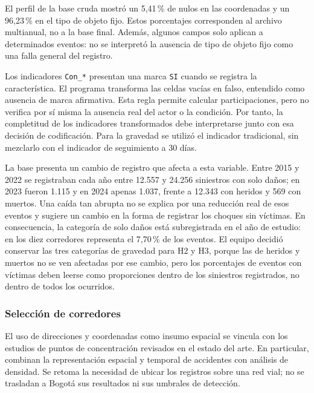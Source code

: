 \documentclass[12pt,letterpaper]{article}
\begin{document}
El perfil de la base cruda mostró un 5,41\,\% de nulos en las
coordenadas y un 96,23\,\% en el tipo de objeto fijo. Estos porcentajes
corresponden al archivo multianual, no a la base final. Además, algunos
campos solo aplican a determinados eventos: no se interpretó la ausencia
de tipo de objeto fijo como una falla general del registro.

Los indicadores \texttt{Con\_*} presentan una marca \texttt{SI} cuando
se registra la característica. El programa transforma las celdas vacías
en falso, entendido como ausencia de marca afirmativa. Esta regla permite
calcular participaciones, pero no verifica por sí misma la ausencia real
del actor o la condición. Por tanto, la completitud de los indicadores
transformados debe interpretarse junto con esa decisión de codificación.
Para la gravedad se utilizó el indicador tradicional, sin mezclarlo con
el indicador de seguimiento a 30 días.

La base presenta un cambio de registro que afecta a esta variable. Entre
2015 y 2022 se registraban cada año entre 12.557 y 24.256 siniestros con
solo daños; en 2023 fueron 1.115 y en 2024 apenas 1.037, frente a 12.343
con heridos y 569 con muertos. Una caída tan abrupta no se explica por
una reducción real de esos eventos y sugiere un cambio en la forma de
registrar los choques sin víctimas. En consecuencia, la categoría de solo daños está
subregistrada en el año de estudio: en los diez corredores representa
el 7,70\,\% de los eventos. El equipo decidió conservar las tres
categorías de gravedad para H2 y H3, porque las de heridos y muertos no
se ven afectadas por ese cambio, pero los porcentajes de eventos con
víctimas deben leerse como proporciones dentro de los siniestros
registrados, no dentro de todos los ocurridos.

\hypertarget{etapa-2-definiciuxf3n-de-corredores-y-periodo}{%
\subsubsection{Selección de corredores}\label{etapa-2-definiciuxf3n-de-corredores-y-periodo}}

El uso de direcciones y coordenadas como insumo espacial se vincula con
los estudios de puntos de concentración revisados en el estado del arte.
En particular, \citet{zhang2023} combinan la representación espacial y
temporal de accidentes con análisis de densidad. Se retoma la necesidad
de ubicar los registros sobre una red vial; no se trasladan a Bogotá
sus resultados ni sus umbrales de detección.
\end{document}

